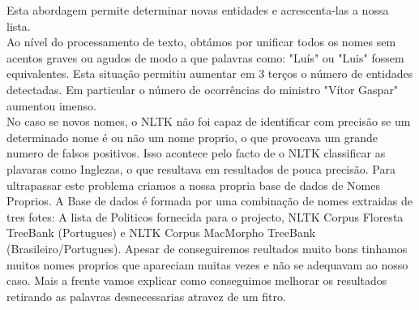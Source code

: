 Esta abordagem permite determinar novas entidades e acrescenta-las a nossa lista.\\
\hspace{15pt}Ao nível do processamento de texto, obtámos por unificar todos os nomes sem acentos graves ou agudos de modo a que palavras como: "Luís" ou "Luis" fossem equivalentes. Esta situação permitiu aumentar em 3 terços o número de entidades detectadas. Em particular o número de ocorrências do ministro "Vítor Gaspar" aumentou imenso.\\
No caso se novos nomes, o NLTK não foi capaz de identificar com precisão se um determinado nome é ou não um nome proprio, o que provocava um grande numero de falsos positivos. Isso acontece pelo facto de o NLTK classificar as plavaras como Inglezas, o que resultava em resultados de pouca precisão. Para ultrapassar este problema criamos a nossa propria base de dados de Nomes Proprios. A Base de dados é formada por uma combinação de nomes extraidas de tres fotes: A lista de Politicos fornecida para o projecto, NLTK Corpus Floresta TreeBank (Portugues) e NLTK Corpus MacMorpho TreeBank (Brasileiro/Portugues). Apesar de conseguiremos reultados muito bons tinhamos muitos nomes proprios que apareciam muitas vezes e não se adequavam ao nosso caso. Mais a frente vamos explicar como conseguimos melhorar os resultados retirando as palavras desnecessarias atravez de um fitro. 